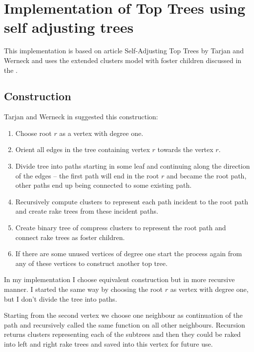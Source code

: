 \chapter{Implementation of Top Trees using self adjusting trees}
\label{chap:ImplementationSelfAdjusting}

This implementation is based on article {\I Self-Adjusting Top Trees}
\cite{SelfAdjustingTT} by Tarjan and Werneck and uses the extended clusters
model with foster children discussed in the .

\section{Construction}

Tarjan and Werneck in \cite{SelfAdjustingTT} suggested this construction:
\begin{enumerate}
\item Choose root $r$ as a vertex with degree one.
\item Orient all edges in the tree containing vertex $r$ towards the vertex $r$.
\item Divide tree into paths starting in some leaf and continuing along the
direction of the edges -- the first path will end in the root $r$ and became the
{\I root path}, other paths end up being connected to some existing path.
\item Recursively compute clusters to represent each path incident to the
root path and create {\I rake trees} from these incident paths.
\item Create binary tree of compress clusters to represent the root path and
connect rake trees as foster children.
\item If there are some unused vertices of degree one start the process again
from any of these vertices to construct another top tree.
\end{enumerate}

In my implementation I choose equivalent construction but in more recursive
manner. I started the same way by choosing the root $r$ as vertex with degree
one, but I don't divide the tree into paths.

Starting from the second vertex we choose one neighbour as continuation of the
path and recursively called the same function on all other neighbours. Recursion
returns clusters representing each of the subtrees and then they could be
raked into left and right rake trees and saved into this vertex for future use.

